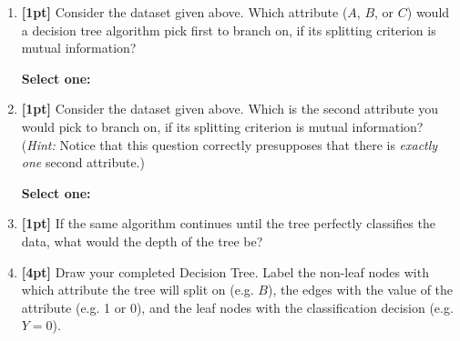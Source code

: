 \documentclass[11pt]{article}
\renewcommand{\circle}{\tikz\draw[black] (0,0) circle (1ex);}
\numberwithin{equation}{section} %
\numberwithin{figure}{section} %
\numberwithin{table}{section} %
\begin{document}
\begin{enumerate}
    \begin{tcolorbox}[fit,height=1cm, width=2cm, blank, borderline={1pt}{-2pt},nobeforeafter]
    \end{tcolorbox}
    
    
    \item \textbf{[1pt]} Consider the dataset given above. Which attribute ($A$, $B$, or $C$) would a decision tree algorithm pick first to branch on, if its splitting criterion is mutual information?
    
    \textbf{Select one:}
    
    
    \item \textbf{[1pt]} Consider the dataset given above. Which is the second attribute you would pick to branch on, if its splitting criterion is mutual information? (\emph{Hint:} Notice that this question correctly presupposes that there is \emph{exactly one} second attribute.)
    
    \textbf{Select one:}
    
    
    \item \textbf{[1pt]} If the same algorithm continues until the tree perfectly classifies the data, what would the depth of the tree be?
    
    \begin{tcolorbox}[fit,height=1cm, width=2cm, blank, borderline={1pt}{-2pt},nobeforeafter]
    \end{tcolorbox}
    
    
\clearpage
    \item \textbf{[4pt]} Draw your completed Decision Tree. Label the non-leaf nodes with which attribute the tree will split on (e.g. $B$), the edges with the value of the attribute (e.g. 1 or 0), and the leaf nodes with the classification decision (e.g. $Y=0$).
    
    \begin{solution}
    \bigskip \bigskip \bigskip \bigskip \bigskip \bigskip \bigskip \bigskip
    \bigskip \bigskip \bigskip \bigskip \bigskip \bigskip \bigskip \bigskip
    \bigskip \bigskip \bigskip \bigskip \bigskip \bigskip \bigskip \bigskip
    \bigskip \bigskip \bigskip \bigskip \bigskip \bigskip \bigskip \bigskip
    \bigskip \bigskip \bigskip \bigskip \bigskip \bigskip \bigskip \bigskip
    \bigskip \bigskip \bigskip \bigskip \bigskip \bigskip \bigskip \bigskip
    \end{solution}
    
\end{enumerate}
\end{document}
